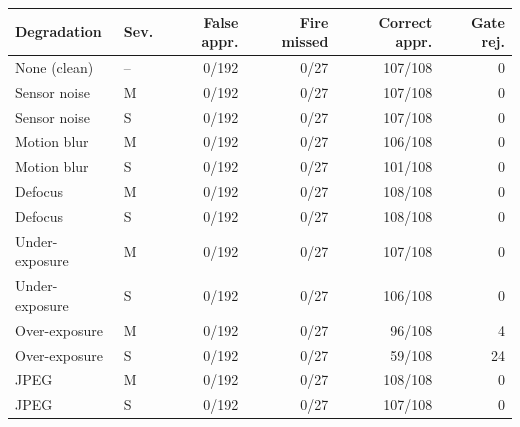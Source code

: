 \begin{tabular}{llrrrr}\toprule
Degradation & Sev. & False appr. & Fire missed & Correct appr. & Gate rej. \\\midrule
None (clean) & -- & 0/192 & 0/27 & 107/108 & 0 \\\midrule
Sensor noise & M & 0/192 & 0/27 & 107/108 & 0 \\
Sensor noise & S & 0/192 & 0/27 & 107/108 & 0 \\
Motion blur & M & 0/192 & 0/27 & 106/108 & 0 \\
Motion blur & S & 0/192 & 0/27 & 101/108 & 0 \\
Defocus & M & 0/192 & 0/27 & 108/108 & 0 \\
Defocus & S & 0/192 & 0/27 & 108/108 & 0 \\
Under-exposure & M & 0/192 & 0/27 & 107/108 & 0 \\
Under-exposure & S & 0/192 & 0/27 & 106/108 & 0 \\
Over-exposure & M & 0/192 & 0/27 & 96/108 & 4 \\
Over-exposure & S & 0/192 & 0/27 & 59/108 & 24 \\
JPEG & M & 0/192 & 0/27 & 108/108 & 0 \\
JPEG & S & 0/192 & 0/27 & 107/108 & 0 \\
\bottomrule\end{tabular}
